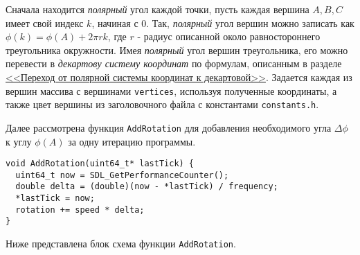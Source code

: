 \documentclass[14pt]{extarticle}
\begin{document}
{\begin{center}
    \end{center}
    \begin{spacing}{1.5}
        Сначала находится \textit{полярный} угол каждой точки, пусть каждая вершина $A, B, C$ имеет свой индекс $k$, начиная с $0$. Так, \textit{полярный} угол вершин можно записать как $\phi(k) = \phi(A) + 2\pi{}rk$, где $r$ - радиус описанной около равностороннего треугольника окружности. Имея \textit{полярный} угол вершин треугольника, его можно перевести в \textit{декартову систему координат} по формулам, описанным в разделе \hyperref[sec:polar]{<<Переход от полярной системы координат к декартовой>>}. Задается каждая из вершин массива с вершинами \verb|vertices|, используя полученные координаты, а также цвет вершины из заголовочного файла с константами \verb|constants.h|.
        \par
        \label{sec:addrotation}
        Далее рассмотрена функция \verb|AddRotation| для добавления необходимого угла $\Delta\phi$ к углу $\phi(A)$ за одну итерацию программы.
    \end{spacing}

    \begin{lstlisting}
void AddRotation(uint64_t* lastTick) {
  uint64_t now = SDL_GetPerformanceCounter();
  double delta = (double)(now - *lastTick) / frequency;
  *lastTick = now;
  rotation += speed * delta;
}\end{lstlisting}

    \begin{spacing}{1.5}
        \noindent
        Ниже представлена блок схема функции \verb|AddRotation|.
    \end{spacing}

    \vspace{-0.2em}
    \begin{center}
\end{center}}
\end{document}
